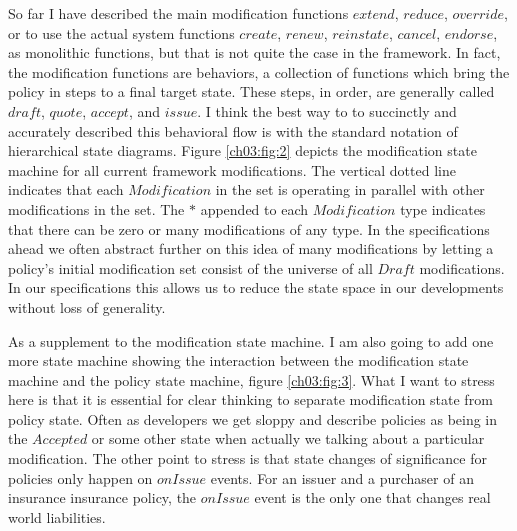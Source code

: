 
So far I have described the main modification functions $extend$, $reduce$, $override$, or to use the actual system
functions $create$, $renew$, $reinstate$, $cancel$, $endorse$, as monolithic functions, but that is not quite the case
in the framework. In fact, the modification functions are behaviors, a collection of functions which bring the policy
in steps to a final target state. These steps, in order, are generally called $draft$, $quote$, $accept$, and $issue$.
I think the best way to to succinctly and accurately described this behavioral flow is with the 
standard notation of hierarchical state diagrams. Figure \ref{ch03:fig:2} depicts the modification state machine for all current
framework modifications. The vertical
dotted line indicates that each $Modification$ in the set is operating in parallel with other modifications in the set. The
$*$ appended to each $Modification$ type indicates that there can be zero or many modifications of any type. In the
specifications ahead we often abstract further on this idea of many modifications by letting a policy's initial
modification set consist of the universe of all $Draft$ modifications. In our specifications this allows us to reduce the
state space in our developments without loss of generality.

As a supplement to the modification state machine. I am also going to add one more state machine showing the interaction between the modification
state machine and the policy state machine, figure \ref{ch03:fig:3}. What I want to stress here is that it is essential
for clear thinking to separate modification state from policy state. Often as developers we get sloppy and describe policies
as being in the $Accepted$ or some other state when actually we talking about a particular modification. The other point to stress is
that state changes of significance for policies only happen on $onIssue$ events. For an issuer and a purchaser
of an insurance insurance policy, the $onIssue$ event is the only one that changes real world liabilities.

